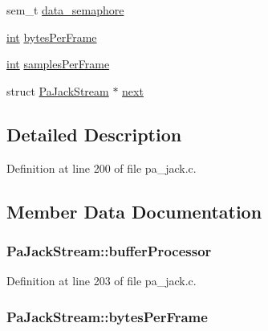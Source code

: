 \begin{DoxyCompactItemize}
sem\+\_\+t \hyperlink{struct_pa_jack_stream_a128e233cdb75f07e72937e7ae577d0f1}{data\+\_\+semaphore}
\item 
\hyperlink{xmltok_8h_a5a0d4a5641ce434f1d23533f2b2e6653}{int} \hyperlink{struct_pa_jack_stream_a4dc3d7e512df3c97bff7c1f6b1b40a9d}{bytes\+Per\+Frame}
\item 
\hyperlink{xmltok_8h_a5a0d4a5641ce434f1d23533f2b2e6653}{int} \hyperlink{struct_pa_jack_stream_a4dd12058c95f9547625686ef80b296a2}{samples\+Per\+Frame}
\item 
struct \hyperlink{struct_pa_jack_stream}{Pa\+Jack\+Stream} $\ast$ \hyperlink{struct_pa_jack_stream_a3a2e2f3009c7c00d29b245b93e426cb0}{next}
\end{DoxyCompactItemize}


\subsection{Detailed Description}


Definition at line 200 of file pa\+\_\+jack.\+c.



\subsection{Member Data Documentation}
\subsubsection[{\texorpdfstring{buffer\+Processor}{bufferProcessor}}]{ Pa\+Jack\+Stream\+::buffer\+Processor}\hypertarget{struct_pa_jack_stream_a20b9a40e42f26c09691da1209f9fb7cb}{}\label{struct_pa_jack_stream_a20b9a40e42f26c09691da1209f9fb7cb}


Definition at line 203 of file pa\+\_\+jack.\+c.

\subsubsection[{\texorpdfstring{bytes\+Per\+Frame}{bytesPerFrame}}]{ Pa\+Jack\+Stream\+::bytes\+Per\+Frame}\hypertarget{struct_pa_jack_stream_a4dc3d7e512df3c97bff7c1f6b1b40a9d}{}\label{struct_pa_jack_stream_a4dc3d7e512df3c97bff7c1f6b1b40a9d}


